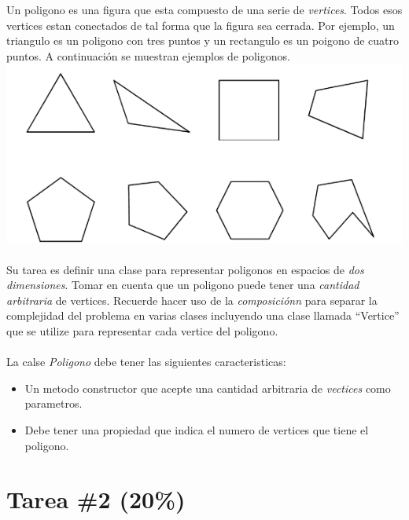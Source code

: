 \documentclass{article}
\begin{document}
Un poligono es una figura que esta compuesto de una serie de \emph{vertices}. Todos esos
vertices estan conectados de tal forma que la figura sea cerrada. Por ejemplo, un
triangulo es un poligono con tres puntos y un rectangulo es un poigono de cuatro
puntos. A continuaci\'on se muestran ejemplos de poligonos.
\includegraphics{polygons.png}
\\\\
Su tarea es definir una clase para representar poligonos en espacios de \emph{dos
dimensiones}. Tomar en cuenta que un poligono puede tener una \emph{cantidad arbitraria}
de vertices. Recuerde hacer uso de la \emph{composici\'onn} para separar la complejidad
del problema en varias clases incluyendo una clase llamada ``Vertice'' que se utilize
para representar cada vertice del poligono.
\\\\
La calse \emph{Poligono} debe tener las siguientes caracteristicas:
\begin{itemize}
        \item{Un metodo constructor que acepte una cantidad arbitraria de \emph{vectices}
        como parametros.}
        \item{Debe tener una propiedad que indica el numero de vertices que tiene el
        poligono.}
\end{itemize}

\section*{Tarea \#2 (20\%)}
\end{document}
